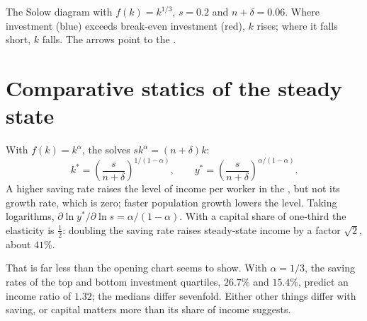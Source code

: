 \begin{omfigure}

{\small The Solow diagram with $f(k) = k^{1/3}$, $s = 0.2$ and $n + \delta = 0.06$. Where
investment (blue) exceeds break-even investment (red), $k$ rises; where it
falls short, $k$ falls. The arrows point to the .}
\end{omfigure}

\section{Comparative statics of the steady state}\label{sec:b1:solow-model:statics}

With $f(k) = k^{\alpha}$, the  solves $sk^{\alpha} = (n + \delta)k$:
\[
k^* = \left(\frac{s}{n + \delta}\right)^{1/(1 - \alpha)}, \qquad
y^* = \left(\frac{s}{n + \delta}\right)^{\alpha/(1 - \alpha)}.
\]
A higher saving rate raises the level of income per worker in the , but not its growth rate, which is zero; faster population growth
lowers the level. Taking logarithms,
$\partial \ln y^*/\partial \ln s = \alpha/(1 - \alpha)$. With a capital share of one-third the
elasticity is $\tfrac12$: doubling the saving rate raises steady-state income
by a factor $\sqrt 2$, about $41\%$.

That is far less than the opening chart seems to show. With $\alpha = 1/3$, the
saving rates of the top and bottom investment quartiles, $26.7\%$ and
$15.4\%$, predict an income ratio of $1.32$; the medians differ sevenfold.
Either other things differ with saving, or capital matters more than its
share of income suggests.

